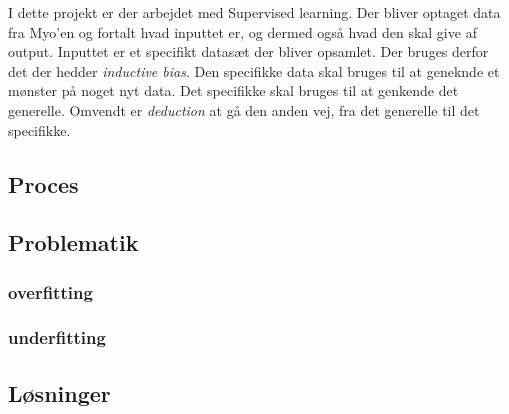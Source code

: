 I dette projekt er der arbejdet med Supervised learning. Der bliver optaget data fra Myo'en og fortalt hvad inputtet er, og dermed også hvad den skal give af output. Inputtet er et specifikt datasæt der bliver opsamlet. Der bruges derfor det der hedder \textit{inductive bias}. Den specifikke data skal bruges til at geneknde et mønster på noget nyt data. Det specifikke skal bruges til at genkende det generelle. Omvendt er \textit{deduction} at gå den anden vej, fra det generelle til det specifikke.





\subsection{Proces}
\subsection{Problematik}


\subsubsection{overfitting}
\subsubsection{underfitting}

\subsection{Løsninger}
